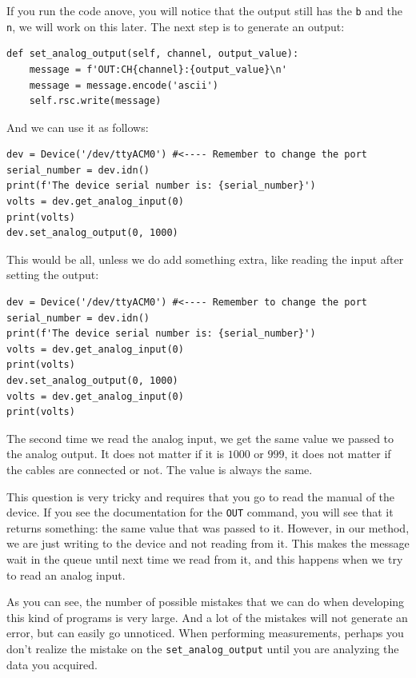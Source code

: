 If you run the code anove, you will notice that the output still has the \texttt{b} and the \texttt{\\n}, we will work on this later. The next step is to generate an output:

\begin{verbatim}
def set_analog_output(self, channel, output_value):
    message = f'OUT:CH{channel}:{output_value}\n'
    message = message.encode('ascii')
    self.rsc.write(message)
\end{verbatim}

And we can use it as follows:

\begin{verbatim}
dev = Device('/dev/ttyACM0') #<---- Remember to change the port
serial_number = dev.idn()
print(f'The device serial number is: {serial_number}')
volts = dev.get_analog_input(0)
print(volts)
dev.set_analog_output(0, 1000)
\end{verbatim}

This would be all, unless we do add something extra, like reading the input after setting the output:

\begin{verbatim}
dev = Device('/dev/ttyACM0') #<---- Remember to change the port
serial_number = dev.idn()
print(f'The device serial number is: {serial_number}')
volts = dev.get_analog_input(0)
print(volts)
dev.set_analog_output(0, 1000)
volts = dev.get_analog_input(0)
print(volts)
\end{verbatim}

The second time we read the analog input, we get the same value we passed to the analog output. It does not matter if it is $1000$ or $999$, it does not matter if the cables are connected or not. The value is always the same. 


This question is very tricky and requires that you go to read the manual of the device. If you see the documentation for the \texttt{OUT} command, you will see that it returns something: the same value that was passed to it. However, in our method, we are just writing to the device and not reading from it. This makes the message wait in the queue until next time we read from it, and this happens when we try to read an analog input. 

As you can see, the number of possible mistakes that we can do when developing this kind of programs is very large. And a lot of the mistakes will not generate an error, but can easily go unnoticed. When performing measurements, perhaps you don't realize the mistake on the \texttt{set\_analog\_output} until you are analyzing the data you acquired. 

